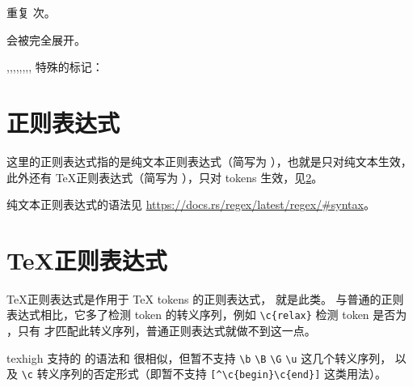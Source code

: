 \documentclass[class=article,openany]{cusdoc}[2025/09/29]
\begin{document}
\begin{function}[EXP]{\texhigh@replicate}
  \begin{syntax}
    \V{\texhigh@replicate}  
  \end{syntax}
重复   次。
\end{function}

\begin{function}{\texhigh@pdfliteral}
  \begin{syntax}
    \V{\texhigh@pdfliteral} 
  \end{syntax}
 会被完全展开。
\end{function}

\begin{function}{\THmB,\THmC,\THmD,\THmH,\THmN,\THmP,\THmR,\THmS,\THmT}
特殊的标记：
\end{function}

\section{正则表达式}\label{sec:regex}

这里的正则表达式指的是纯文本正则表达式（简写为 ），也就是只对纯文本生效，此外还有 \TeX 正则表达式（简写为 ），只对 tokens 生效，见\cref{sec:regtex}。

纯文本正则表达式的语法见 \url{https://docs.rs/regex/latest/regex/#syntax}。


\section{\TeX 正则表达式}\label{sec:regtex}

\TeX 正则表达式是作用于 {\TeX} tokens 的正则表达式， 就是此类。
与普通的正则表达式相比，它多了检测 token 的转义序列，例如 \verb|\c{relax}| 检测 token
是否为 ，只有  才匹配此转义序列，普通正则表达式就做不到这一点。

texhigh 支持的  的语法和 \autocite{l3kernel} 很相似，但暂不支持
\verb|\b| \verb|\B| \verb|\G| \verb|\u| 这几个转义序列，
以及 \verb|\c| 转义序列的否定形式（即暂不支持 \verb|[^\c{begin}\c{end}]| 这类用法）。
\end{document}
